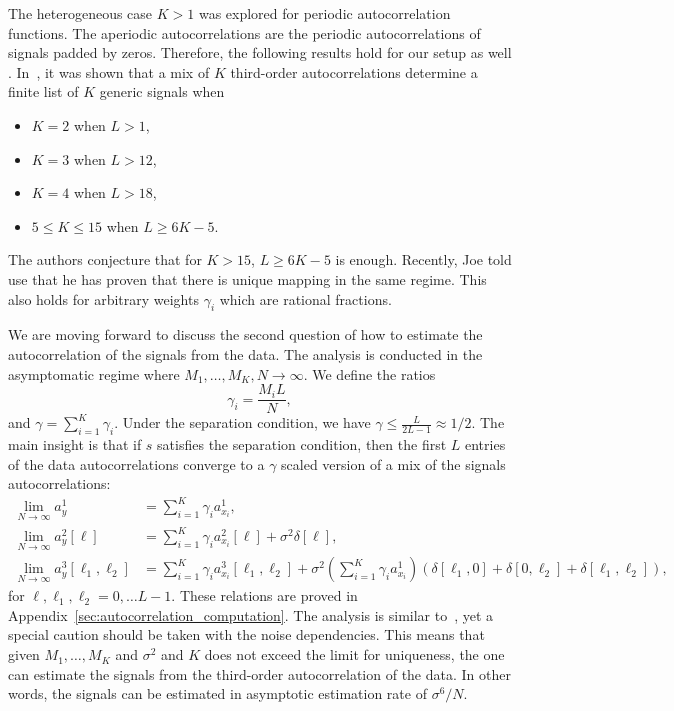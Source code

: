 \documentclass[english,11pt]{article}
\newcommand{\TODO}[1]{{\color{red}{[#1]}}}
\numberwithin{equation}{section}
\theoremstyle{plain}
\theoremstyle{definition}
\theoremstyle{remark}
\theoremstyle{plain}
\theoremstyle{remark}
\theoremstyle{plain}
\theoremstyle{plain}
\begin{document}
The heterogeneous case $K>1$ was explored for periodic autocorrelation functions. The aperiodic autocorrelations are the periodic autocorrelations of signals padded by zeros. Therefore, the following results hold for our setup as well  \TODO{we should be prudent here to make sure that this set does not ``fall'' in the zero measure}. In~\cite{bandeira2017estimation}, it was shown that a mix of $K$ third-order autocorrelations determine  a finite list of $K$ generic signals when 
\begin{itemize}
	\item $K=2$ when $L>1$,
	\item $K=3$ when $L>12$,
	\item $K=4$ when $L>18$,
	\item $5\leq K\leq 15$ when $L\geq 6K-5$.	
\end{itemize}
The authors conjecture that for $K>15$, $L\geq 6K-5$ is enough. Recently, Joe told use that he has proven that there is unique mapping in the same regime.  
This also holds for arbitrary weights $\gamma_i$ which are rational fractions.

\TODO{Where we should refer to Gianakis's paper?}

We are moving forward to discuss the second question of how to estimate the autocorrelation of the signals from the data. 
The analysis is conducted in the asymptomatic regime where $M_1,\ldots,M_K,N\to\infty$. We define the ratios 
\begin{equation}
\gamma_i = \frac{M_i L}{N},
\end{equation}
and $\gamma = \sum_{i=1}^K\gamma_i$.
Under the separation condition, we have $\gamma\leq\frac{L}{2L-1}\approx 1/2$.
The main insight is that if $s$ satisfies the separation condition, then the first $L$ entries of the data autocorrelations converge to a $\gamma$ scaled version of a mix of the signals autocorrelations:
\begin{align}
\lim_{N\to\infty} a_y^1 &= \sum_{i=1}^K\gamma_i a_{x_i}^1, \\
\lim_{N\to\infty} a_y^2[\ell] &= \sum_{i=1}^K\gamma_i a_{x_i}^2[\ell] +\sigma^2\delta[\ell],\\
\lim_{N\to\infty} a_y^3[\ell_1,\ell_2] &= \sum_{i=1}^K\gamma_i a_{x_i}^3[\ell_1,\ell_2] + \sigma^2\left(\sum_{i=1}^K\gamma_i a_{x_i}^1\right)(\delta[\ell_1,0]+\delta[0,\ell_2]+\delta[\ell_1,\ell_2]),
\end{align}
for $\ell,\ell_1,\ell_2=0,\ldots L-1$.
These relations are proved in Appendix~\ref{sec:autocorrelation_computation}. The analysis is similar to~\cite{bendory2017bispectrum,boumal2017heterogeneous}, yet a special caution should be taken with the noise dependencies. This means that given $M_1,\ldots,M_K$ and $\sigma^2$ and $K$ does not exceed the limit for uniqueness, the one can estimate the signals from the third-order autocorrelation of the data. In other words, the signals can be estimated in asymptotic estimation rate of $\sigma^6/N$.
\end{document}
